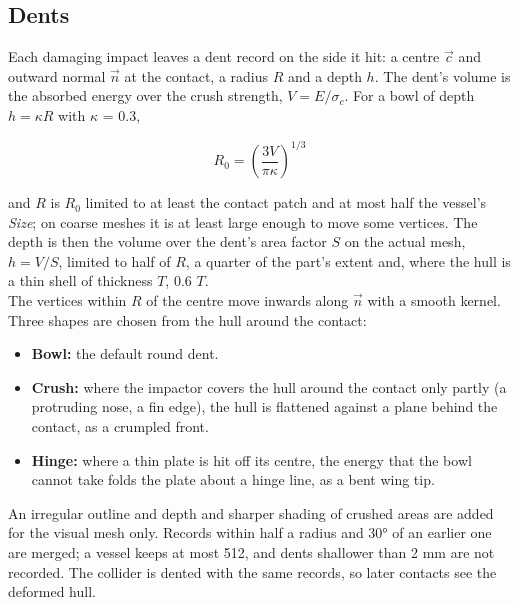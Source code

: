 \documentclass[Orbiter Technical Reference.tex]{subfiles}
\begin{document}
\subsection{Dents}
Each damaging impact leaves a dent record on the side it hit: a centre $\vec{c}$ and outward normal $\vec{n}$ at the contact, a radius $R$ and a depth $h$. The dent's volume is the absorbed energy over the crush strength, $V = E/\sigma_{c}$. For a bowl of depth $h = \kappa R$ with $\kappa$ = 0.3,

\[ R_{0} = \left(\frac{3V}{\pi \kappa}\right)^{1/3} \]

\noindent
and $R$ is $R_{0}$ limited to at least the contact patch and at most half the vessel's \textit{Size}; on coarse meshes it is at least large enough to move some vertices. The depth is then the volume over the dent's area factor $S$ on the actual mesh, $h = V/S$, limited to half of $R$, a quarter of the part's extent and, where the hull is a thin shell of thickness $T$, 0.6 $T$.\\
The vertices within $R$ of the centre move inwards along $\vec{n}$ with a smooth kernel. Three shapes are chosen from the hull around the contact:

\begin{itemize}
\item \textbf{Bowl:} the default round dent.
\item \textbf{Crush:} where the impactor covers the hull around the contact only partly (a protruding nose, a fin edge), the hull is flattened against a plane behind the contact, as a crumpled front.
\item \textbf{Hinge:} where a thin plate is hit off its centre, the energy that the bowl cannot take folds the plate about a hinge line, as a bent wing tip.
\end{itemize}

\noindent
An irregular outline and depth and sharper shading of crushed areas are added for the visual mesh only. Records within half a radius and 30° of an earlier one are merged; a vessel keeps at most 512, and dents shallower than 2 mm are not recorded. The collider is dented with the same records, so later contacts see the deformed hull.
\end{document}
